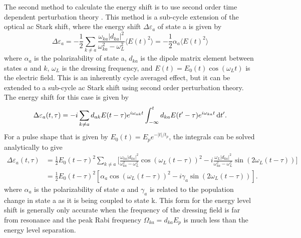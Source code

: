 The second method to calculate the energy shift is to use second order time dependent perturbation theory \cite{chiniSubcycleAcStark2012,chiniCharacterizationApplicationIsolated2012,bransdenPhysicsAtomsMolecules2003, griffithsIntroductionQuantumMechanics2005}.  This method is a sub-cycle extension of the optical ac Stark shift, where the energy shift $\Delta\varepsilon_a$ of state a is given by
\begin{equation}
	\label{eqn:optical_stark}
	\Delta\varepsilon_a=-\frac{1}{2}\sum_{k\neq a}\frac{\omega_{ka}\rvert d_{ka} \lvert^2}{\omega_{ka}^2 - \omega_L^2}\langle E(t)^2 \rangle =-\frac{1}{2}\alpha_a \langle E(t)^2 \rangle
\end{equation}
where $\alpha_a$ is the polarizability of state a, $d_{ka}$ is the dipole matrix element between states $a$ and $k$, $\omega_L$ is the dressing frequency, and $E(t)=E_0(t)\cos(\omega_L t)$ is the electric field.  This is an inherently cycle averaged effect, but it can be extended to a sub-cycle ac Stark shift using second order perturbation theory. The energy shift for this case is given by
\begin{equation}
	\label{eqn:SOPT}
	\Delta\varepsilon_a(t,\tau)=-i\sum_{k\neq a}d_{ak}E(t-\tau)e^{i\omega_{ak}t}\int_{-\infty}^{t} d_{ka}E(t'-\tau)e^{i\omega_{ka}t}\mathop{}\!\mathrm{d} t'.
\end{equation}
For a pulse shape that is given by $E_0(t)=E_pe^{-\rvert t \lvert/t_p}$, the integrals can be solved analytically to give
\begin{equation}
	\label{eqn:SOPT_integrated}
	\begin{aligned}
	\Delta\varepsilon_a(t,\tau) &=\frac{1}{2}E_0(t-\tau)^2\sum_{k\neq a}\bigg[ \frac{\omega_{ka}\rvert d_{ka} \lvert^2}{\omega_{ka}^2 - \omega_L^2}\cos(\omega_L (t-\tau))^2 -i\frac{\omega_{L}\rvert d_{ka} \lvert^2}{\omega_{ka}^2 - \omega_L^2}\sin(2\omega_{L} (t-\tau))\bigg]\\
	&=\frac{1}{2}E_0(t-\tau)^2[\alpha_a\cos(\omega_{L} (t-\tau))^2 - i\gamma_{a}\sin(2\omega_{L} (t-\tau))].
	\end{aligned}
\end{equation}
where $\alpha_a$ is the polarizability of state $a$ and $\gamma_{a}$ is related to the population change in state a as it is being coupled to state k.  This form for the energy level shift is generally only accurate when the frequency of the dressing field is far from resonance and the peak Rabi frequency $\Omega_{ka} = d_{ka}E_p$ is much less than the energy level separation.

